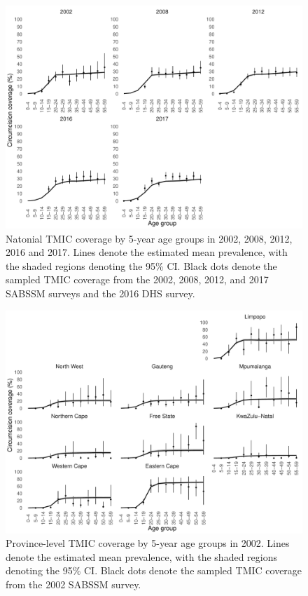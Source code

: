 \documentclass{article}
\begin{document}
\begin{appendix}
\begin{figure}[H]
	\centering
	\includegraphics[width = \linewidth]{Figures/suppmat/ModelFit/TMICPrev_5year_National_withsurveypoints}
	\caption{Natonial  TMIC coverage by 5-year age groups in 2002, 2008, 2012, 2016 and 2017. Lines denote the estimated mean prevalence, with the shaded regions denoting the 95\% CI. Black dots denote the sampled TMIC coverage from the 2002, 2008, 2012, and 2017 SABSSM surveys and the 2016 DHS survey.}
\end{figure}


\begin{figure}[H]
	\centering
	\includegraphics[width = \linewidth]{Figures/suppmat/ModelFit/TMICPrev_5year_Province_2002_withsurveypoints}
	\caption{Province-level TMIC coverage by 5-year age groups in 2002. Lines denote the estimated mean prevalence, with the shaded regions denoting the 95\% CI. Black dots denote the sampled TMIC coverage from the 2002 SABSSM survey.}
\end{figure}


\end{appendix}
\end{document}
